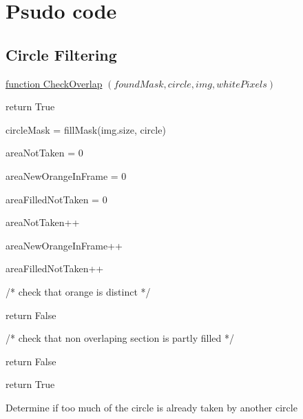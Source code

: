 \documentclass[conference]{IEEEtran}
\begin{document}
\section{Psudo code}

\subsection{Circle Filtering}


\begin{algorithm} 

    \underline{function CheckOverlap} $(foundMask, circle, img, whitePixels)$\;
    
    {
    	return True
    }
        
    circleMask = fillMask(img.size, circle)
    
    areaNotTaken = 0
    
    areaNewOrangeInFrame = 0
    
    areaFilledNotTaken = 0
    
    {
	 {
		{
			areaNotTaken++
		}
		
		{
			areaNewOrangeInFrame++
		}
		
		{
			areaFilledNotTaken++
		}
	 }
    }
    
    /* check that orange is distinct */
    
     {
	return False
    }
    
    /* check that non overlaping section is partly filled */
    
     {
	return False
    }
    
    return True
    
    \caption{Determine if too much of the circle is already taken by another circle} \label{CheckOverlapAlg}
\end{algorithm}
\end{document}
